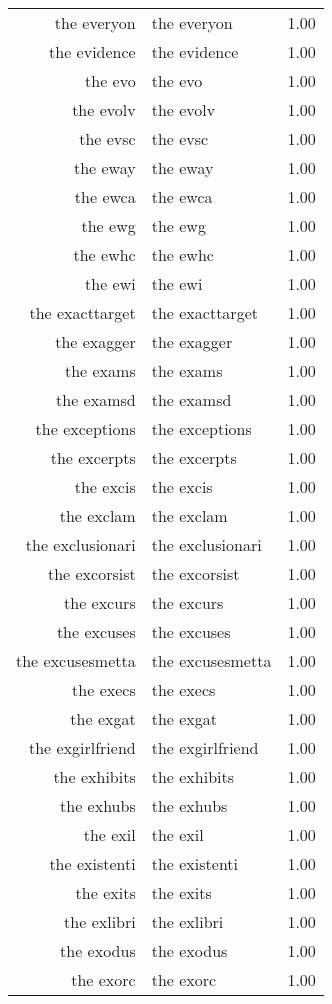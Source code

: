 \begin{table}[ht]
\begin{tabular}{rlr}
  the everyon & the everyon & 1.00 \\ 
  the evidence & the evidence & 1.00 \\ 
  the evo & the evo & 1.00 \\ 
  the evolv & the evolv & 1.00 \\ 
  the evsc & the evsc & 1.00 \\ 
  the eway & the eway & 1.00 \\ 
  the ewca & the ewca & 1.00 \\ 
  the ewg & the ewg & 1.00 \\ 
  the ewhc & the ewhc & 1.00 \\ 
  the ewi & the ewi & 1.00 \\ 
  the exacttarget & the exacttarget & 1.00 \\ 
  the exagger & the exagger & 1.00 \\ 
  the exams & the exams & 1.00 \\ 
  the examsd & the examsd & 1.00 \\ 
  the exceptions & the exceptions & 1.00 \\ 
  the excerpts & the excerpts & 1.00 \\ 
  the excis & the excis & 1.00 \\ 
  the exclam & the exclam & 1.00 \\ 
  the exclusionari & the exclusionari & 1.00 \\ 
  the excorsist & the excorsist & 1.00 \\ 
  the excurs & the excurs & 1.00 \\ 
  the excuses & the excuses & 1.00 \\ 
  the excusesmetta & the excusesmetta & 1.00 \\ 
  the execs & the execs & 1.00 \\ 
  the exgat & the exgat & 1.00 \\ 
  the exgirlfriend & the exgirlfriend & 1.00 \\ 
  the exhibits & the exhibits & 1.00 \\ 
  the exhubs & the exhubs & 1.00 \\ 
  the exil & the exil & 1.00 \\ 
  the existenti & the existenti & 1.00 \\ 
  the exits & the exits & 1.00 \\ 
  the exlibri & the exlibri & 1.00 \\ 
  the exodus & the exodus & 1.00 \\ 
  the exorc & the exorc & 1.00 \\ 

\end{tabular}
\end{table}
